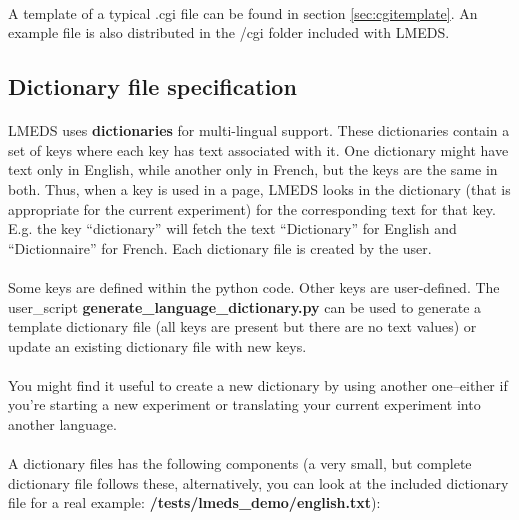 \paragraph{}
A template of a typical .cgi file can be found in section \ref{sec:cgitemplate}.  An example file is also distributed in the /cgi folder included with LMEDS.


\subsection{Dictionary file specification}
\label{sec:dictionarySpec}

\paragraph{}
LMEDS uses \textbf{dictionaries} for multi-lingual support.  These dictionaries contain a set of keys where each key has text associated with it.  One dictionary might have text only in English, while another only in French, but the keys are the same in both.  Thus, when a key is used in a page, LMEDS looks in the dictionary (that is appropriate for the current experiment) for the corresponding text for that key.  E.g. the key ``dictionary'' will fetch the text ``Dictionary'' for English and  ``Dictionnaire'' for French.  Each dictionary file is created by the user.

\paragraph{}
Some keys are defined within the python code.  Other keys are user-defined.  The user\_script \textbf{generate\_language\_dictionary.py} can be used to generate a template dictionary file (all keys are present but there are no text values) or update an existing dictionary file with new keys.

\paragraph{}
You might find it useful to create a new dictionary by using another one--either if you're starting a new experiment or translating your current experiment into another language.

\paragraph{}
A dictionary files has the following components (a very small, but complete dictionary file follows these, alternatively, you can look at the included dictionary file for a real example: \textbf{/tests/lmeds\_demo/english.txt}):


